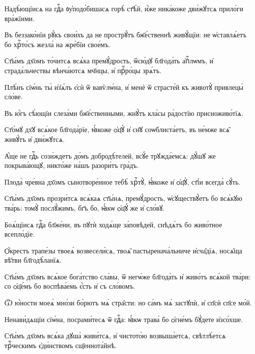 \hKv Надѣ́ющїисѧ на гдⷭ҇а ᲂу҆подо́бишасѧ горѣ̀ ст҃ѣ́й, и҆̀же  ника́коже дви́жꙋтсѧ прило́ги вра́жїими. 

\hKv Въ беззако́нїи рꙋ́къ свои́хъ да не прострꙋ́тъ бж҃е́ственнѣ  живꙋ́щїи: не ѡ҆ставлѧ́етъ бо хрⷭ҇то́съ жезла̀ на жре́бїи  свое́мъ. 
%

\hKv Ст҃ы́мъ дх҃омъ то́читсѧ всѧ́ка премꙋ́дрость,  ѿсю́дꙋ бл҃года́ть а҆пⷭ҇лѡмъ, и҆ страда́льчествы  вѣнча́ютсѧ мч҃нцы, и҆ прⷪ҇ро́цы зрѧ́тъ. 
%

\hKv Плѣ́нъ сїѡ́нь ты̀ и҆з̾ѧ́лъ є҆сѝ ѿ вавѷлѡ́на, и҆ менѐ  ѿ страсте́й къ животꙋ̀ привлецы̀ сло́ве.  

\hKv Въ ю҆́гъ сѣ́ющїи слеза́ми бж҃е́ственными, жнꙋ́тъ кла́сы  ра́достїю присноживо́тїѧ. 
%

\hKv Ст҃о́мꙋ дх҃ꙋ всѧ́кое бл҃года́рїе, ꙗ҆́коже ѻ҆ц҃ꙋ̀  и҆ сн҃ꙋ соѡблиста́етъ, въ не́мже всѧ̑ живꙋ́тъ и҆ дви́жꙋтсѧ. 
%

\hKv А҆́ще не гдⷭ҇ь сози́ждетъ до́мъ добродѣ́телей, всꙋ́е  трꙋжда́емсѧ: дꙋ́шꙋ же покрыва́ющꙋ, никто́же на́шъ разори́тъ  гра́дъ. 

\hKv Плода̀ чре́вна дх҃омъ сынотворе́нное тебѣ̀ хрⷭ҇тꙋ̀,  ꙗ҆́коже и҆ ѻ҆ц҃ꙋ̀, ст҃і́и всегда̀ сꙋ́ть. 
%

\hKv Ст҃ы́мъ дх҃омъ прозри́тсѧ всѧ́каѧ ст҃ы́нѧ,  премꙋ́дрость, ѡ҆сꙋществꙋ́етъ бо всѧ́кꙋю тва́рь: томꙋ̀  послꙋ́жимъ, бг҃ъ бо, ꙗ҆́кѡ ѻ҆ц҃ꙋ́ же и҆ сло́вꙋ.  
%

\hKv Боѧ́щїисѧ гдⷭ҇а бл҃же́ни, въ пꙋтѝ ходѧ́ще за́повѣдей,  снѣдѧ́тъ бо живо́тное всепло́дїе.  

\hKv Ѻ҆́крестъ трапе́зы твоеѧ̀ возвесели́сѧ, твоѧ̑  пастыренача́льниче и҆сча̑дїѧ, носѧ̑ща вѣ̑тви  бл҃годѣ́ланїѧ. 
%

\hKv Ст҃ы́мъ дх҃омъ всѧ́кое бога́тство сла́вы, ѿ  негѡ́же бл҃года́ть и҆ живо́тъ всѧ́кой тва́ри: со ѻ҆ц҃е́мъ  бо воспѣва́емь є҆́сть и҆ съ сло́вомъ. 
%

\hKv Ѿ ю҆́ности моеѧ̀ мно́зи бо́рютъ мѧ̀ стра̑сти: но са́мъ мѧ̀  застꙋпѝ, и҆ сп҃сѝ сп҃се мо́й. 

\hKv Ненави́дѧщїи сїѡ́на, посрами́тесѧ ѿ гдⷭ҇а: ꙗ҆́кѡ трава́  бо ѻ҆гне́мъ бꙋ́дете и҆зсо́хше. 
%

\hKv Ст҃ы́мъ дх҃омъ всѧ́ка дꙋша̀ живи́тсѧ, и҆ чистото́ю  возвыша́етсѧ, свѣтлѣ́етсѧ трⷪ҇ческимъ є҆ди́нствомъ  сщ҃еннота́йнѣ. 
%


